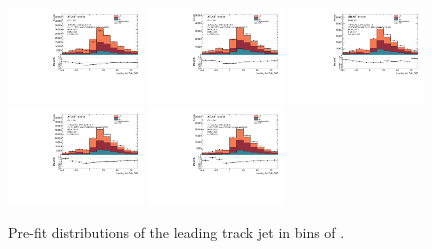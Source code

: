 \begin{figure}[htbp]
  \centering
 \includegraphics[width=0.32\textwidth]{figures/gbb/Sub_Sd0_Fits/Canv_PreFit_-3-logM_bb_over_p_TG--22_LpT_INF_SpT_INF_coarse_x.pdf}
 \includegraphics[width=0.32\textwidth]{figures/gbb/Sub_Sd0_Fits/Canv_PreFit_-22-logM_bb_over_p_TG--19_LpT_INF_SpT_INF_coarse_x.pdf}
 \includegraphics[width=0.32\textwidth]{figures/gbb/Sub_Sd0_Fits/Canv_PreFit_-19-logM_bb_over_p_TG--15_LpT_INF_SpT_INF_coarse_x.pdf}\\
 \includegraphics[width=0.32\textwidth]{figures/gbb/Sub_Sd0_Fits/Canv_PreFit_-15-logM_bb_over_p_TG--11_LpT_INF_SpT_INF_coarse_x.pdf}
 \includegraphics[width=0.32\textwidth]{figures/gbb/Sub_Sd0_Fits/Canv_PreFit_-11-logM_bb_over_p_TG-0_LpT_INF_SpT_INF_coarse_x.pdf}

\caption{Pre-fit \subsdzero distributions of the leading track jet in bins of \mpt. }
  \label{fig:fracmasspt-prefits-leading}
\end{figure}


